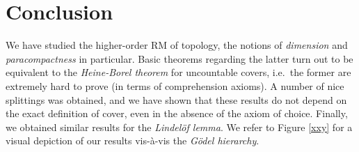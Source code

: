 \documentclass[reqno]{amsart}
\newtheorem{defi}[thm]{Definition}
\def\bdefi{\begin{defi}\rm}
\def\edefi{\end{defi}}
\def\R{{\mathbb  R}}
\def\di{\rightarrow}
\def\HBU{\textup{\textsf{HBU}}}
\def\LIL{\textup{\textsf{LIL}}}
\numberwithin{equation}{section}
\numberwithin{thm}{section}
\begin{document}
%
%
%
%


\section{Conclusion}\label{konkelfoes}
We have studied the higher-order RM of topology, the notions of \emph{dimension} and \emph{paracompactness} in particular. 
Basic theorems regarding the latter turn out to be equivalent to the \emph{Heine-Borel theorem} for uncountable covers, i.e.\ the former are extremely hard to prove (in terms of comprehension axioms).    
A number of nice splittings was obtained, and we have shown that these results do not depend on the exact definition of cover, even in the absence of the axiom of choice.  
Finally, we obtained similar results for the \emph{Lindel\"of lemma}.  We refer to Figure \ref{xxy} for a visual depiction of our results vis-\`a-vis the \emph{G\"odel hierarchy}.
\end{document}
